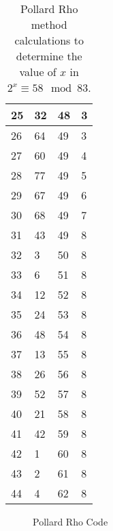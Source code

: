 \begin{table}[P]
\begin{tabular}{l l l l}
25 & 32 & 48 & 3 \\\hline
26 & 64 & 49 & 3 \\\hline
27 & 60 & 49 & 4 \\\hline
28 & 77 & 49 & 5 \\\hline
29 & 67 & 49 & 6 \\\hline
30 & 68 & 49 & 7 \\\hline
31 & 43 & 49 & 8 \\\hline
32 & 3 & 50 & 8 \\\hline
33 & 6 & 51 & 8 \\\hline
34 & 12 & 52 & 8 \\\hline
35 & 24 & 53 & 8 \\\hline
36 & 48 & 54 & 8 \\\hline
37 & 13 & 55 & 8 \\\hline
38 & 26 & 56 & 8 \\\hline
39 & 52 & 57 & 8 \\\hline
40 & 21 & 58 & 8 \\\hline
41 & 42 & 59 & 8 \\\hline
42 & 1 & 60 & 8 \\\hline
43 & 2 & 61 & 8 \\\hline
44 & 4 & 62 & 8 \\\hline
\end{tabular}
\label{tab:rho}
\caption{Pollard Rho method calculations to determine the value of $x$ in $2^x \equiv 58 \mod 83$.}
\end{table}

\begin{figure}[P]
\caption{Pollard Rho Code}

\end{figure}
